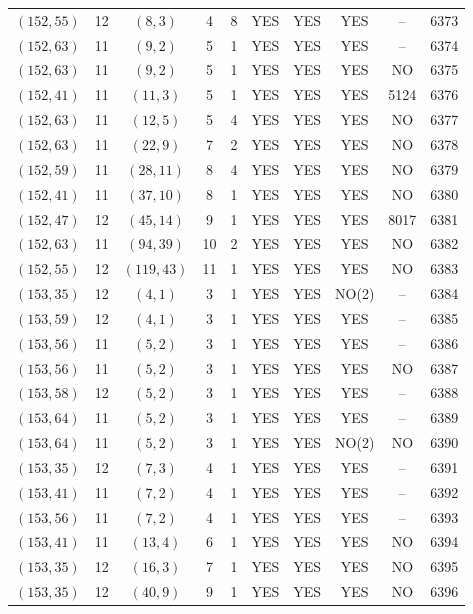 \begin{longtable}{|c|c|c|c|c|c|c|c|c|c|}
$(152, 55)$ & 12 & $(8, 3)$ & 4 & 8 & YES & YES & YES & -- & 6373\\
$(152, 63)$ & 11 & $(9, 2)$ & 5 & 1 & YES & YES & YES & -- & 6374\\
$(152, 63)$ & 11 & $(9, 2)$ & 5 & 1 & YES & YES & YES & NO & 6375\\
$(152, 41)$ & 11 & $(11, 3)$ & 5 & 1 & YES & YES & YES & 5124 & 6376\\
$(152, 63)$ & 11 & $(12, 5)$ & 5 & 4 & YES & YES & YES & NO & 6377\\
$(152, 63)$ & 11 & $(22, 9)$ & 7 & 2 & YES & YES & YES & NO & 6378\\
$(152, 59)$ & 11 & $(28, 11)$ & 8 & 4 & YES & YES & YES & NO & 6379\\
$(152, 41)$ & 11 & $(37, 10)$ & 8 & 1 & YES & YES & YES & NO & 6380\\
$(152, 47)$ & 12 & $(45, 14)$ & 9 & 1 & YES & YES & YES & 8017 & 6381\\
$(152, 63)$ & 11 & $(94, 39)$ & 10 & 2 & YES & YES & YES & NO & 6382\\
$(152, 55)$ & 12 & $(119, 43)$ & 11 & 1 & YES & YES & YES & NO & 6383\\
$(153, 35)$ & 12 & $(4, 1)$ & 3 & 1 & YES & YES & NO(2) & -- & 6384\\
$(153, 59)$ & 12 & $(4, 1)$ & 3 & 1 & YES & YES & YES & -- & 6385\\
$(153, 56)$ & 11 & $(5, 2)$ & 3 & 1 & YES & YES & YES & -- & 6386\\
$(153, 56)$ & 11 & $(5, 2)$ & 3 & 1 & YES & YES & YES & NO & 6387\\
$(153, 58)$ & 12 & $(5, 2)$ & 3 & 1 & YES & YES & YES & -- & 6388\\
$(153, 64)$ & 11 & $(5, 2)$ & 3 & 1 & YES & YES & YES & -- & 6389\\
$(153, 64)$ & 11 & $(5, 2)$ & 3 & 1 & YES & YES & NO(2) & NO & 6390\\
$(153, 35)$ & 12 & $(7, 3)$ & 4 & 1 & YES & YES & YES & -- & 6391\\
$(153, 41)$ & 11 & $(7, 2)$ & 4 & 1 & YES & YES & YES & -- & 6392\\
$(153, 56)$ & 11 & $(7, 2)$ & 4 & 1 & YES & YES & YES & -- & 6393\\
$(153, 41)$ & 11 & $(13, 4)$ & 6 & 1 & YES & YES & YES & NO & 6394\\
$(153, 35)$ & 12 & $(16, 3)$ & 7 & 1 & YES & YES & YES & NO & 6395\\
$(153, 35)$ & 12 & $(40, 9)$ & 9 & 1 & YES & YES & YES & NO & 6396\\

\end{longtable}
